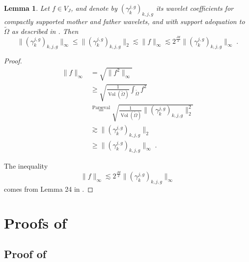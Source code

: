 \documentclass{article}
\theoremstyle{plain}
\newtheorem{lemma}[theorem]{Lemma}
\theoremstyle{definition}
\theoremstyle{remark}
\newcommand\p[1]{\left( {#1}\right)}
\newcommand\vol[0]{\operatorname{Vol}}
\begin{document}
\begin{lemma}
\label{lemma:comparison_of_norms}
    Let $f \in V_J$, and denote by $(\gamma_k^{j, g})_{k, j, g}$ its wavelet coefficients for compactly supported mother and father wavelets, and with support adequation to $\tilde{\Omega}$ as described in . 
    Then 
    \begin{equation}
        \| (\gamma_k^{j, g})_{k, j, g}\|_{\infty}
        \leq 
         \| (\gamma_k^{j, g})_{k, j, g}\|_{2}
         \lesssim 
          \| f\|_{\infty}
          \lesssim 
          2^{\frac{J d}{2}} \| (\gamma_k^{j, g})_{k, j, g}\|_{\infty} \;.
    \end{equation}
\end{lemma}
\begin{proof}
    \begin{equation}
        \begin{aligned}
            \| f\|_{\infty} 
            &= \sqrt{\| f^2\|_{\infty} } \\
            &\geq \sqrt{ \frac{1}{\vol \p{\tilde{\Omega}}}  \int_{\tilde{\Omega}} f^2 } \\
            &\stackrel{\text{Parseval}}{=} {\sqrt{ \frac{1}{\vol \p{\tilde{\Omega}}}  \| (\gamma_k^{j, g})_{k, j, g}\|_{2}^2 }} \\
            &\gtrsim \| (\gamma_k^{j, g})_{k, j, g}\|_{2} \\
            &\geq \| (\gamma_k^{j, g})_{k, j, g}\|_{\infty} \;.
        \end{aligned}
    \end{equation}

The inequality 
\begin{equation}
    \| f\|_{\infty}
          \lesssim 
          2^{\frac{J d}{2}} \| (\gamma_k^{j, g})_{k, j, g}\|_{\infty}
\end{equation}
comes from Lemma 24 in \cite{hutter2021minimax}.

\end{proof}

\section{Proofs of }

\subsection{Proof of }
\label{proof_of_risk_decomposition}
\end{document}
